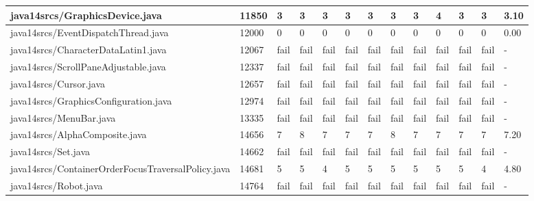 \begin{tabular}{|l|l|l|l|l|l|l|l|l|l|l|l|l|}
\hline
java14srcs/GraphicsDevice.java                     & 11850       & 3         & 3         & 3         & 3         & 3         & 3         & 3         & 4         & 3         & 3         & 3.10      \\
\hline
java14srcs/EventDispatchThread.java                & 12000       & 0         & 0         & 0         & 0         & 0         & 0         & 0         & 0         & 0         & 0         & 0.00      \\
\hline
java14srcs/CharacterDataLatin1.java                & 12067       & fail      & fail      & fail      & fail      & fail      & fail      & fail      & fail      & fail      & fail      & -         \\
\hline
java14srcs/ScrollPaneAdjustable.java               & 12337       & fail      & fail      & fail      & fail      & fail      & fail      & fail      & fail      & fail      & fail      & -         \\
\hline
java14srcs/Cursor.java                             & 12657       & fail      & fail      & fail      & fail      & fail      & fail      & fail      & fail      & fail      & fail      & -         \\
\hline
java14srcs/GraphicsConfiguration.java              & 12974       & fail      & fail      & fail      & fail      & fail      & fail      & fail      & fail      & fail      & fail      & -         \\
\hline
java14srcs/MenuBar.java                            & 13335       & fail      & fail      & fail      & fail      & fail      & fail      & fail      & fail      & fail      & fail      & -         \\
\hline
java14srcs/AlphaComposite.java                     & 14656       & 7         & 8         & 7         & 7         & 7         & 8         & 7         & 7         & 7         & 7         & 7.20      \\
\hline
java14srcs/Set.java                                & 14662       & fail      & fail      & fail      & fail      & fail      & fail      & fail      & fail      & fail      & fail      & -         \\
\hline
java14srcs/ContainerOrderFocusTraversalPolicy.java & 14681       & 5         & 5         & 4         & 5         & 5         & 5         & 5         & 5         & 5         & 4         & 4.80      \\
\hline
java14srcs/Robot.java                              & 14764       & fail      & fail      & fail      & fail      & fail      & fail      & fail      & fail      & fail      & fail      & -         \\

\end{tabular}
